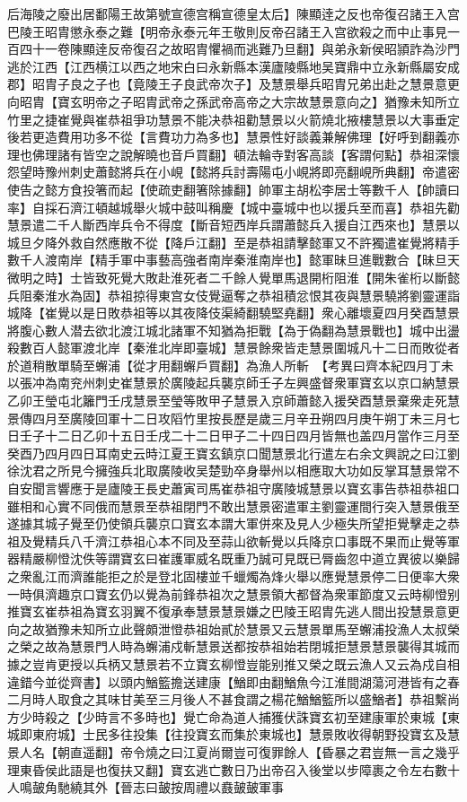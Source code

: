 后海陵之廢出居鄱陽王故第號宣德宫稱宣德皇太后】陳顯逹之反也帝復召諸王入宫巴陵王昭胄懲永泰之難【明帝永泰元年王敬則反帝召諸王入宫欲殺之而中止事見一百四十一卷陳顯逹反帝復召之故昭胄懼禍而逃難乃旦翻】與弟永新侯昭頴詐為沙門逃於江西【江西横江以西之地宋白曰永新縣本漢廬陵縣地吴寶鼎中立永新縣屬安成郡】昭胄子良之子也【竟陵王子良武帝次子】及慧景舉兵昭胄兄弟出赴之慧景意更向昭胄【寶玄明帝之子昭胄武帝之孫武帝高帝之大宗故慧景意向之】猶豫未知所立竹里之捷崔覺與崔恭祖爭功慧景不能决恭祖勸慧景以火箭燒北掖樓慧景以大事垂定後若更造費用功多不從【言費功力為多也】慧景性好談義兼解佛理【好呼到翻義亦理也佛理諸有皆空之說解曉也音戶買翻】頓法輪寺對客高談【客謂何點】恭祖深懷怨望時豫州刺史蕭懿將兵在小峴【懿將兵討壽陽屯小峴將即亮翻峴所典翻】帝遣密使告之懿方食投箸而起【使疏吏翻箸除據翻】帥軍主胡松李居士等數千人【帥讀曰率】自採石濟江頓越城舉火城中鼓叫稱慶【城中臺城中也以援兵至而喜】恭祖先勸慧景遣二千人斷西岸兵令不得度【斷音短西岸兵謂蕭懿兵入援自江西來也】慧景以城旦夕降外救自然應散不從【降戶江翻】至是恭祖請擊懿軍又不許獨遣崔覺將精手數千人渡南岸【精手軍中事藝高強者南岸秦淮南岸也】懿軍昧旦進戰數合【昧旦天微明之時】士皆致死覺大敗赴淮死者二千餘人覺單馬退開桁阻淮【開朱雀桁以斷懿兵阻秦淮水為固】恭祖掠得東宫女伎覺逼奪之恭祖積忿恨其夜與慧景驍將劉靈運詣城降【崔覺以是日敗恭祖等以其夜降伎渠綺翻驍堅堯翻】衆心離壞夏四月癸酉慧景將腹心數人潜去欲北渡江城北諸軍不知猶為拒戰【為于偽翻為慧景戰也】城中出盪殺數百人懿軍渡北岸【秦淮北岸即臺城】慧景餘衆皆走慧景圍城凡十二日而敗從者於道稍散單騎至蠏浦【從才用翻蠏戶買翻】為漁人所斬　【考異曰齊本紀四月丁未以張冲為南兖州刺史崔慧景於廣陵起兵襲京師壬子左興盛督衆軍寶玄以京口納慧景乙卯王瑩屯北籬門壬戌慧景至瑩等敗甲子慧景入京師蕭懿入援癸酉慧景棄衆走死慧景傳四月至廣陵回軍十二日攻䧟竹里按長歷是歲三月辛丑朔四月庚午朔丁未三月七日壬子十二日乙卯十五日壬戌二十二日甲子二十四日四月皆無也盖四月當作三月至癸酉乃四月四日耳南史云時江夏王寶玄鎮京口聞慧景北行遣左右余文興說之曰江劉徐沈君之所見今擁強兵北取廣陵收吴楚勁卒身舉州以相應取大功如反掌耳慧景常不自安聞言響應于是廬陵王長史蕭寅司馬崔恭祖守廣陵城慧景以寶玄事告恭祖恭祖口雖相和心實不同俄而慧景至恭祖閉門不敢出慧景密遣軍主劉靈運間行突入慧景俄至遂據其城子覺至仍使領兵襲京口寶玄本謂大軍併來及見人少極失所望拒覺擊走之恭祖及覺精兵八千濟江恭祖心本不同及至蒜山欲斬覺以兵降京口事既不果而止覺等軍器精嚴柳憕沈佚等謂寶玄曰崔護軍威名既重乃誠可見既已脣齒忽中道立異彼以樂歸之衆亂江而濟誰能拒之於是登北固樓並千蠟燭為烽火舉以應覺慧景停二日便率大衆一時俱濟趣京口寶玄仍以覺為前鋒恭祖次之慧景領大都督為衆軍節度又云時柳憕别推寶玄崔恭祖為寶玄羽翼不復承奉慧景慧景嫌之巴陵王昭胄先逃人間出投慧景意更向之故猶豫未知所立此聲頗泄憕恭祖始貳於慧景又云慧景單馬至蠏浦投漁人太叔榮之榮之故為慧景門人時為蠏浦戍斬慧景送都按恭祖始若閉城拒慧景慧景襲得其城而據之豈肯更授以兵柄又慧景若不立寶玄柳憕豈能别推又榮之既云漁人又云為戍自相違錯今並從齊書】以頭内鰌籃擔送建康【鰌即由翻鰌魚今江淮間湖蕩河港皆有之春二月時人取食之其味甘美至三月後人不甚食謂之楊花鰌鰌籃所以盛鰌者】恭祖繫尚方少時殺之【少時言不多時也】覺亡命為道人捕獲伏誅寶玄初至建康軍於東城【東城即東府城】士民多往投集【往投寶玄而集於東城也】慧景敗收得朝野投寶玄及慧景人名【朝直遥翻】帝令燒之曰江夏尚爾豈可復罪餘人【昏暴之君豈無一言之幾乎理東昏侯此語是也復扶又翻】寶玄逃亡數日乃出帝召入後堂以步障裹之令左右數十人鳴皷角馳繞其外【晉志曰皷按周禮以鼖皷皷軍事